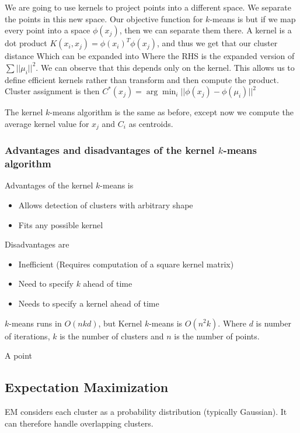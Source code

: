     We are going to use kernels to project points into a different space. We separate the points in this new space. Our objective function for $k$-means is
    but if we map every point into a space $\phi(x_j)$, then we can separate them there. A kernel is a dot product $K(x_i, x_j) = \phi(x_i)^T \phi(x_j)$, and thus we get that our cluster distance
    Which can be expanded into
    Where the RHS is the expanded version of $\sum{||\mu_i||^2}$. We can observe that this depends only on the kernel. This allows us to define efficient kernels rather than transform and then compute the product.
    Cluster assignment is then $C^*(x_j) = \arg \min_i{||\phi(x_j) - \phi(\mu_i)||^2}$
    
    The kernel $k$-means algorithm is the same as before, except now we compute the average kernel value for $x_j$ and $C_i$ as centroids.
    
\subsubsection{Advantages and disadvantages of the kernel $k$-means algorithm}
    Advantages of the kernel $k$-means is
    \begin{itemize}
        \item Allows detection of clusters with arbitrary shape
        \item Fits any possible kernel
    \end{itemize}
    Disadvantages are
    \begin{itemize}
        \item Inefficient (Requires computation of a square kernel matrix)
        \item Need to specify $k$ ahead of time
        \item Needs to specify a kernel ahead of time
    \end{itemize}
    $k$-means runs in $O(nkd)$, but Kernel $k$-means is $O(n^2k)$. Where $d$ is number of iterations, $k$ is the number of clusters and $n$ is the number of points.

    A point 

\subsection{Expectation Maximization}
EM considers each cluster as a probability distribution (typically Gaussian). It can therefore handle overlapping clusters.

